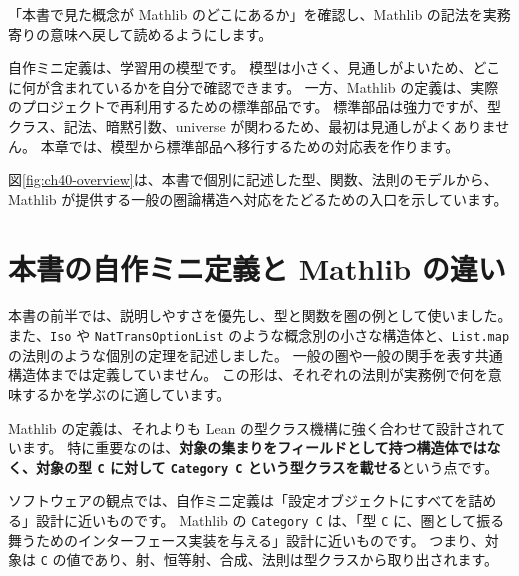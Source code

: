 「本書で見た概念が Mathlib のどこにあるか」を確認し、Mathlib の記法を実務寄りの意味へ戻して読めるようにします。

自作ミニ定義は、学習用の模型です。
模型は小さく、見通しがよいため、どこに何が含まれているかを自分で確認できます。
一方、Mathlib の定義は、実際のプロジェクトで再利用するための標準部品です。
標準部品は強力ですが、型クラス、記法、暗黙引数、universe が関わるため、最初は見通しがよくありません。
本章では、模型から標準部品へ移行するための対応表を作ります。


図\ref{fig:ch40-overview}は、本書で個別に記述した型、関数、法則のモデルから、Mathlib が提供する一般の圏論構造へ対応をたどるための入口を示しています。

\section{本書の自作ミニ定義と Mathlib の違い}

本書の前半では、説明しやすさを優先し、型と関数を圏の例として使いました。
また、\texttt{Iso} や \texttt{NatTransOptionList} のような概念別の小さな構造体と、\texttt{List.map} の法則のような個別の定理を記述しました。
一般の圏や一般の関手を表す共通構造体までは定義していません。
この形は、それぞれの法則が実務例で何を意味するかを学ぶのに適しています。

Mathlib の定義は、それよりも Lean の型クラス機構に強く合わせて設計されています。
特に重要なのは、\textbf{対象の集まりをフィールドとして持つ構造体ではなく、対象の型 \texttt{C} に対して \texttt{Category C} という型クラスを載せる}という点です。

ソフトウェアの観点では、自作ミニ定義は「設定オブジェクトにすべてを詰める」設計に近いものです。
Mathlib の \texttt{Category C} は、「型 \texttt{C} に、圏として振る舞うためのインターフェース実装を与える」設計に近いものです。
つまり、対象は \texttt{C} の値であり、射、恒等射、合成、法則は型クラスから取り出されます。

